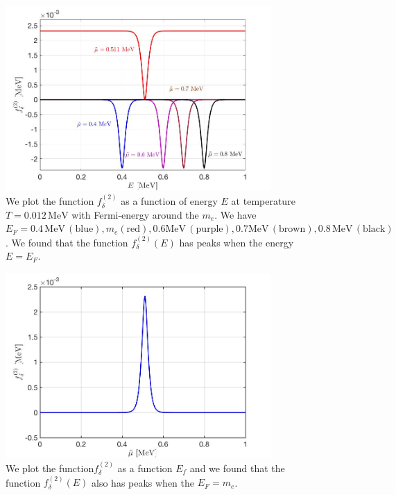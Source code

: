 \documentclass[onecolumn,preprintnumbers,amsmath,amssymb]{revtex4}
\begin{document}
\begin{figure}[t]
\begin{center}
\includegraphics[width=0.9\textwidth]{./plot/f_delta002}
\caption{We plot the function $f^{(2)}_\delta$ as a function of energy $E$ at temperature $T=0.012\,\mathrm{MeV}$ with Fermi-energy around the $m_e$. We have $E_F=0.4\,\mathrm{MeV\,(blue)}, m_e\mathrm{(red)}, 0.6\mathrm{MeV\,(purple)}, 0.7\mathrm{MeV\,(brown)}, 0.8\,\mathrm{MeV\,(black)}$. We found that the function $f^{(2)}_\delta(E)$ has peaks when the energy  $E=E_F$. }
\label{f_delta002_graph}
\end{center}
\end{figure}
\begin{figure}[h]
\begin{center}
\includegraphics[width=0.9\textwidth]{./plot/f_delta_checking}
\caption{We plot the function$f^{(2)}_\delta$ as a function $E_f$ and we found that the function $f^{(2)}_\delta(E)$ also has peaks when the $E_F=m_e$.}
\label{f_delta_checking_graph}
\end{center}
\end{figure}
\end{document}
